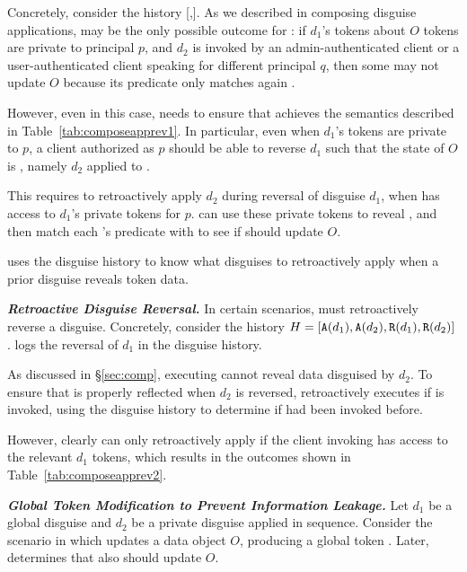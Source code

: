 Concretely, consider the history [,].  As we described in composing disguise
applications, \appcomptwo may be the only possible outcome for : if $d_1$'s tokens
about $O$ tokens are private to principal $p$, and $d_2$ is invoked by an admin-authenticated client or
a user-authenticated client speaking for different principal $q$, then some  may not update $O$ because
its predicate only matches again \xhist{[\app{d_1}]}.

However, even in this case, \sys needs to ensure that 
achieves the semantics described in Table~\ref{tab:composeapprev1}. In particular, even when $d_1$'s
tokens are private to $p$, a client authorized as $p$ should be able to reverse $d_1$ such that the
state of $O$ is \xhist{[\app{d_2}]}, namely $d_2$ applied to \xstart. 

This requires \sys to retroactively apply $d_2$ during reversal of disguise $d_1$, when \sys has
access to $d_1$'s private tokens for $p$. \sys can use these private tokens to reveal \xstart, and
then match each 's predicate with \xstart to see if  should update $O$.

\sys uses the disguise history to know what disguises to retroactively apply when a prior disguise
reveals token data.

\vspace{6pt}\noindent\textbf{\emph{Retroactive Disguise Reversal.}}
In certain scenarios, \sys must retroactively reverse a disguise. 
Concretely, consider the history $H = [\texttt{A}({d_1}),\texttt{A}({d_2}),\texttt{R}({d_1}),\texttt{R}({d_2})]$.
\sys logs the reversal of $d_1$ in the disguise history. 

As discussed in \S\ref{sec:comp}, executing  cannot reveal data disguised by $d_2$. To
ensure that  is properly reflected when $d_2$ is reversed, \sys retroactively executes
 if  is invoked, using the disguise history to determine if  had been invoked before.

However, clearly \sys can only retroactively apply  if the client invoking  has
access to the relevant $d_1$ tokens, which results in the outcomes shown in
Table~\ref{tab:composeapprev2}.


\vspace{6pt}\noindent\textbf{\emph{Global Token Modification to Prevent Information Leakage.}}
%
Let $d_1$ be a global disguise and $d_2$ be a private disguise applied in sequence.  Consider the
scenario in which  updates a data object $O$, producing a global token . Later,
\sys determines that  also should update $O$.

